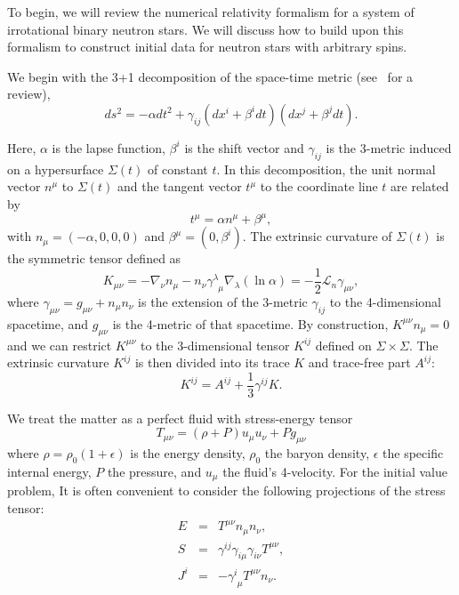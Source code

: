 \documentclass[aps,prd,amsmath,floatfix
,twocolumn
,superscriptaddress,nofootinbib,showpacs]{revtex4-1}
\theoremstyle{plain} \newtheorem{thm}{Theorem} \newtheorem{lem}{Lemma}
\begin{document}
To begin, we will review the numerical relativity formalism for a
system of irrotational binary neutron stars. We will discuss how to
build upon this formalism to construct initial data for neutron stars
with arbitrary spins.

We begin with the 3+1 decomposition of the space-time metric
(see~\cite{2007gr.qc.....3035G} for a review),
\begin{equation}
ds^2 = -\alpha dt^2 + \gamma_{ij}\left(dx^i +
\beta^idt\right)\left(dx^j + \beta^jdt\right).
\end{equation}

Here, $\alpha$ is the lapse function, $\beta^i$ is the shift vector
and $\gamma_{ij}$ is the 3-metric induced on a hypersurface
$\Sigma(t)$ of constant $t$. In this decomposition, the unit normal
vector $n^{\mu}$ to $\Sigma(t)$ and the tangent vector $t^{\mu}$ to
the coordinate line $t$ are related by
\begin{equation}
t^{\mu} = \alpha n^{\mu} + \beta^{\mu},
\end{equation}
with $n_\mu=(-\alpha,0,0,0)$ and $\beta^\mu=(0,\beta^i)$.  The
extrinsic curvature of $\Sigma(t)$ is the symmetric tensor defined as
\begin{equation}
K_{\mu\nu} = -\nabla_\nu n_\mu -n_\nu \gamma^\lambda_{\phantom{\lambda}\mu} \nabla_\lambda (\ln \alpha) =
-\frac{1}{2}\mathcal{L}_n \gamma_{\mu\nu},
\end{equation}
where $\gamma_{\mu \nu}=g_{\mu \nu} + n_\mu n_\nu$ is the extension of
the 3-metric $\gamma_{ij}$ to the 4-dimensional spacetime, and $g_{\mu
  \nu}$ is the 4-metric of that spacetime. By construction, $K^{\mu
  \nu}n_\mu =0$ and we can restrict $K^{\mu \nu}$ to the 3-dimensional
tensor $K^{ij}$ defined on $\Sigma \times \Sigma$. The extrinsic
curvature $K^{ij}$ is then divided into its trace $K$ and trace-free
part $A^{ij}$:
\begin{equation}
K^{ij} = A^{ij} + \frac{1}{3}\gamma^{ij}K.
\end{equation}

We treat the matter as a perfect fluid with stress-energy tensor
\begin{equation}
T_{\mu\nu} = \left(\rho+P\right)u_{\mu}u_{\nu} + Pg_{\mu\nu}
\end{equation}
where $\rho=\rho_0 (1+\epsilon)$ is the energy density, $\rho_0$ the
baryon density, $\epsilon$ the specific internal energy, $P$ the
pressure, and $u_\mu$ the fluid's 4-velocity. For the initial value
problem, It is often convenient to consider the following projections
of the stress tensor:
\begin{eqnarray}
E &=& T^{\mu\nu}n_{\mu}n_{\nu}, \\ S &=&
\gamma^{ij}\gamma_{i\mu}\gamma_{i\nu}T^{\mu\nu},\\ J^{i} &=&
-\gamma^{i}_{\phantom{i}\mu}T^{\mu\nu}n_{\nu}.
\end{eqnarray}
\end{document}
